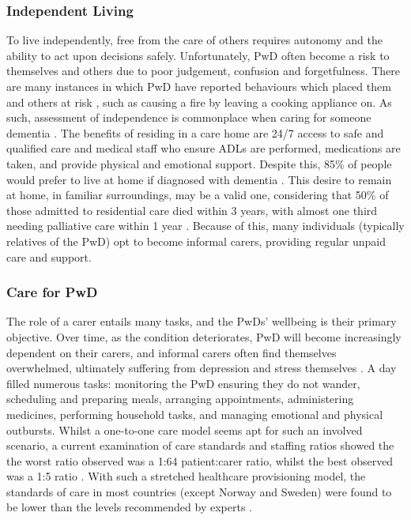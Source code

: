 \subsubsection{Independent Living}
To live independently, free from the care of others requires autonomy and the ability to act upon decisions safely. Unfortunately, PwD often become a risk to themselves and others due to poor judgement, confusion and forgetfulness. There are many instances in which PwD have reported behaviours which placed them and others at risk \cite{Sandberg2015}, such as causing a fire by leaving a cooking appliance on. As such, assessment of independence is commonplace when caring for someone dementia \cite{Sandberg2015, GILMOUR2003}. The benefits of residing in a care home are 24/7 access to safe and qualified care and medical staff who ensure ADLs are performed, medications are taken, and provide physical and emotional support. Despite this, 85\% of people would prefer to live at home if diagnosed with dementia \cite{AlzheimersSociety2014}. This desire to remain at home, in familiar surroundings, may be a valid one, considering that 50\% of those admitted to residential care died within 3 years, with almost one third needing palliative care within 1 year \cite{Hjaltadottir2011}. Because of this, many individuals (typically relatives of the PwD) opt to become informal carers, providing regular unpaid care and support.

\subsubsection{Care for PwD}
The role of a carer entails many tasks, and the PwDs' wellbeing is their primary objective. Over time, as the condition deteriorates, PwD will become increasingly dependent on their carers, and informal carers often find themselves overwhelmed, ultimately suffering from depression and stress themselves \cite{Mahoney2005}. A day filled numerous tasks: monitoring the PwD ensuring they do not wander, scheduling and preparing meals, arranging appointments, administering medicines, performing household tasks, and managing emotional and physical outbursts. Whilst a one-to-one care model seems apt for such an involved scenario, a current examination of care standards and staffing ratios showed the the worst ratio observed was a 1:64 patient:carer ratio, whilst the best observed was a 1:5 ratio \cite{Harrington2012}. With such a stretched healthcare provisioning model, the standards of care in most countries (except Norway and Sweden) were found to be lower than the levels recommended by experts \cite{Harrington2012}.

